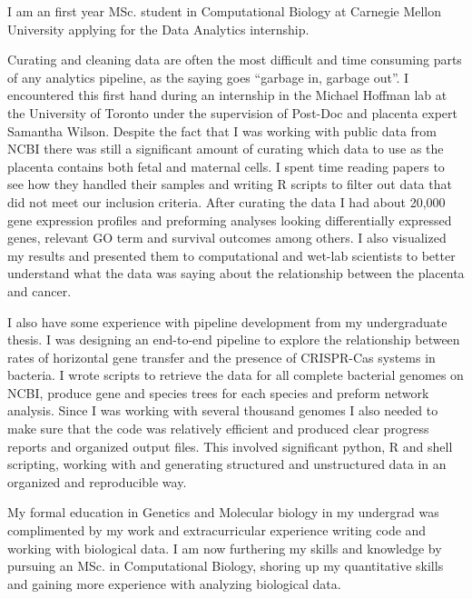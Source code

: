 \documentclass[11pt, a4paper]{./Awesome-CV/awesome-cv}
\begin{document}
\vspace*{\fill}
\makelettertitle %

\begin{cvletter}
\hspace{8mm} I am an first year MSc. student in Computational Biology at Carnegie Mellon University applying for the Data Analytics internship.
\par \hspace{8mm}
Curating and cleaning data are often the most difficult and time consuming parts of any analytics pipeline, as the saying goes ``garbage in, garbage out''.
I encountered this first hand during an internship in the Michael Hoffman lab at the University of Toronto under the supervision of Post-Doc and placenta expert Samantha Wilson.
Despite the fact that I was working with public data from NCBI there was still a significant amount of curating which data to use as the placenta contains both fetal and maternal cells.
I spent time reading papers to see how they handled their samples and writing R scripts to filter out data that did not meet our inclusion criteria.
After curating the data I had about 20,000 gene expression profiles and preforming analyses looking differentially expressed genes, relevant GO term and survival outcomes among others.
I also visualized my results and presented them to computational and wet-lab scientists to better understand what the data was saying about the relationship between the placenta and cancer.
\par \hspace{8mm}
I also have some experience with pipeline development from my undergraduate thesis.
I was designing an end-to-end pipeline to explore the relationship between rates of horizontal gene transfer and the presence of CRISPR-Cas systems in bacteria.
I wrote scripts to retrieve the data for all complete bacterial genomes on NCBI, produce gene and species trees for each species and preform network analysis.
Since I was working with several thousand genomes I also needed to make sure that the code was relatively efficient and produced clear progress reports and organized output files.
This involved significant python, R and shell scripting, working with and generating structured and unstructured data in an organized and reproducible way.
\par \hspace{8mm}
My formal education in Genetics and Molecular biology in my undergrad was complimented by my work and extracurricular experience writing code and working with biological data.
I am now furthering my skills and knowledge by pursuing an MSc. in Computational Biology, shoring up my quantitative skills and gaining more experience with analyzing biological data.

\end{cvletter}
\makeletterclosing
\vspace*{\fill}
\end{document}

